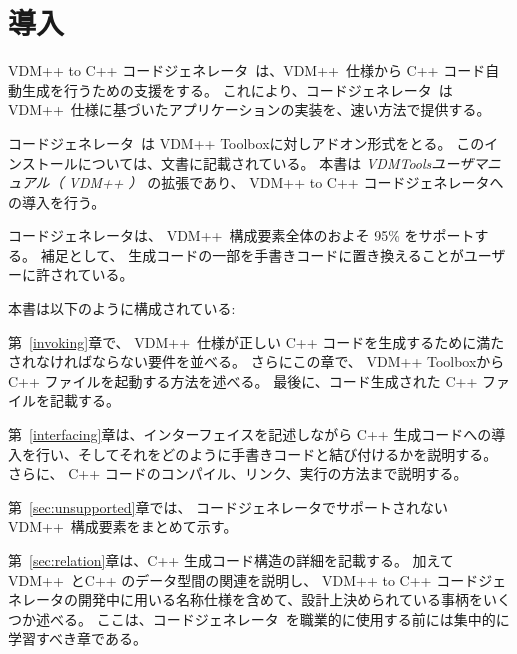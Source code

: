 \documentclass[\pformat,12pt]{jarticle}
\newcommand{\ToolboxName}{VDM++ Toolbox}
\newcommand{\toolbox}{toolbox}
\begin{document}


\newcommand{\tcg}{コードジェネレータ}
\newcommand{\Tcg}{コードジェネレータ}

\newcommand{\libmancite}{\cite{LibMan-SCSK}}
\newcommand{\langmancite}{\cite{LangManPP-SCSK}}
\newcommand{\VDM}{VDM++}
\newcommand{\cg}{VDM++ to C++ コードジェネレータ}
\newcommand{\MCL}{VDM C++ ライブラリ}
\newcommand{\CGBase}{\texttt{CGBase}}



\section{導入}


\cg\ は、\VDM\ 仕様から C++ コード自動生成を行うための支援をする。
これにより、\tcg\ は \VDM\ 仕様に基づいたアプリケーションの実装を、速い方法で提供する。

 \Tcg\ は \ToolboxName{}に対しアドオン形式をとる。
このインストールについては、文書に記載されている。
本書は {\em VDMToolsユーザマニュアル（ \VDM{} ）} の拡張であり、 \cg{}への導入を行う。

コードジェネレータは、 \VDM\ 構成要素全体のおよそ 95\% をサポートする。
補足として、 生成コードの一部を手書きコードに置き換えることがユーザーに許されている。

本書は以下のように構成されている:

第~\ref{invoking}章で、 \VDM\ 仕様が正しい C++ コードを生成するために満たされなければならない要件を並べる。
さらにこの章で、 \ToolboxName{}からC++ ファイルを起動する方法を述べる。
最後に、コード生成された C++ ファイルを記載する。

第~\ref{interfacing}章は、インターフェイスを記述しながら C++ 生成コードへの導入を行い、そしてそれをどのように手書きコードと結び付けるかを説明する。
さらに、 C++ コードのコンパイル、リンク、実行の方法まで説明する。

第~\ref{sec:unsupported}章では、 \tcg{}でサポートされない \VDM\ 構成要素をまとめて示す。

第~\ref{sec:relation}章は、C++ 生成コード構造の詳細を記載する。
加えて \VDM\ とC++ のデータ型間の関連を説明し、 \cg{}の開発中に用いる名称仕様を含めて、設計上決められている事柄をいくつか述べる。
ここは、\tcg\ を職業的に使用する前には集中的に学習すべき章である。
\end{document}
